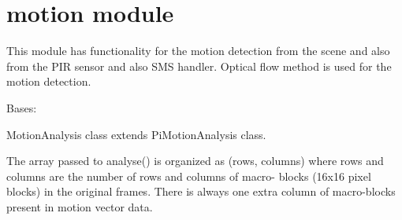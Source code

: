 \documentclass[letterpaper,10pt,english,openany]{sphinxmanual}
\begin{document}
\chapter{motion module}
\label{rpicameramon:motion-module}
This module has functionality for the motion detection from the scene and also from the PIR sensor
and also SMS handler.
Optical flow method is used for the motion detection.
\label{rpicameramon:module-rpicameramon.motion}

\begin{fulllineitems}
\label{rpicameramon:rpicameramon.motion.MotionAnalysis}
Bases: 

MotionAnalysis class extends PiMotionAnalysis class.

The array passed to analyse() is organized as (rows, columns)
where rows and columns are the number of rows and columns of macro-
blocks (16x16 pixel blocks) in the original frames. There is always
one extra column of macro-blocks present in motion vector data.

\begin{fulllineitems}
\label{rpicameramon:rpicameramon.motion.MotionAnalysis.analyse}
\end{fulllineitems}


\end{fulllineitems}

\end{document}
